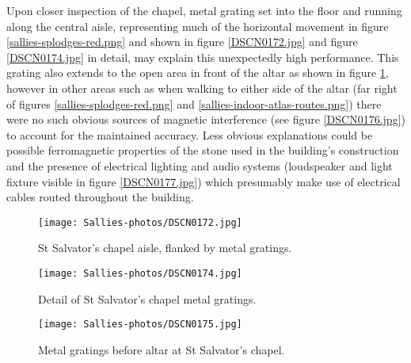 Upon closer inspection of the chapel, metal grating set into the floor and running along the central aisle, representing much of the horizontal movement in figure \ref{sallies-splodges-red.png} and shown in figure \ref{DSCN0172.jpg} and figure \ref{DSCN0174.jpg} in detail, may explain this unexpectedly high performance. This grating also extends to the open area in front of the altar as shown in figure \ref{DSCN0175.jpg}, however in other areas such as when walking to either side of the altar (far right of figures \ref{sallies-splodges-red.png} and \ref{sallies-indoor-atlas-routes.png}) there were no such obvious sources of magnetic interference (see figure \ref{DSCN0176.jpg}) to account for the maintained accuracy. Less obvious explanations could be possible ferromagnetic properties of the stone used in the building's construction and the presence of electrical lighting and audio systems (loudspeaker and light fixture visible in figure \ref{DSCN0177.jpg}) which presumably make use of electrical cables routed throughout the building.

\begin{figure}[h]
    \begin{center}
    \begin{minipage}{.32\textwidth}
        \begin{center}
        \texttt{[image: Sallies-photos/DSCN0172.jpg]}
        \caption{St Salvator's chapel aisle, flanked by metal gratings.}
        \label{DSCN0172.jpg}
        \end{center}
    \end{minipage}%
    \hspace{.01\textwidth}
    \begin{minipage}{.32\textwidth}
		\begin{center}
        \texttt{[image: Sallies-photos/DSCN0174.jpg]}
        \caption{Detail of St Salvator's chapel metal gratings.}
        \label{DSCN0174.jpg}
        \end{center}
    \end{minipage}%
    \hspace{.01\textwidth}
    \begin{minipage}{.32\textwidth}
        \begin{center}
        \texttt{[image: Sallies-photos/DSCN0175.jpg]}
        \caption{Metal gratings before altar at St Salvator's chapel.}
        \label{DSCN0175.jpg}
        \end{center}
    \end{minipage}
    \end{center}
\end{figure}

